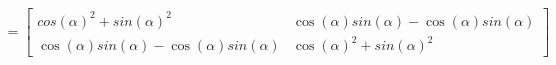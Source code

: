 \documentclass[preview]{standalone}
\begin{document}
\begin{align*}
=\begin{bmatrix} cos(\alpha)^2 + sin(\alpha)^2  & \cos(\alpha) sin(\alpha) - \cos(\alpha)sin(\alpha) \\ \cos(\alpha) sin(\alpha) - \cos(\alpha)sin(\alpha) & \cos(\alpha)^2+  sin(\alpha)^2\end{bmatrix}
\end{align*}
\end{document}
